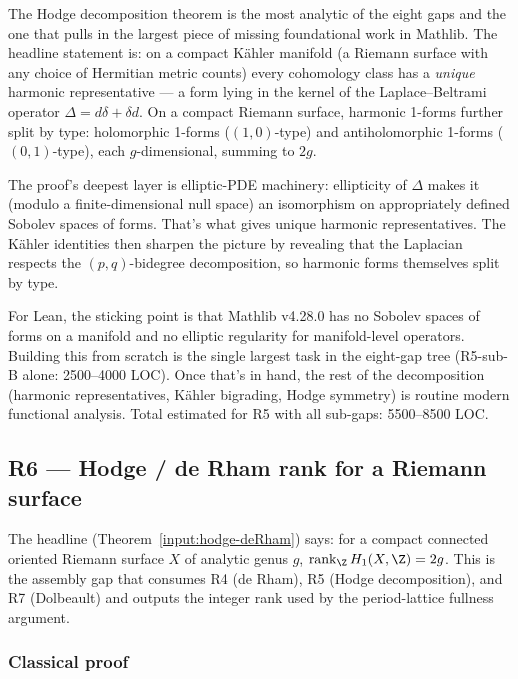 \begin{layman}
The Hodge decomposition theorem is the most analytic of the eight
gaps and the one that pulls in the largest piece of missing
foundational work in Mathlib.  The headline statement is:
on a compact K\"ahler manifold (a Riemann surface with any choice of
Hermitian metric counts) every cohomology class has a \emph{unique}
harmonic representative --- a form lying in the kernel of the
Laplace--Beltrami operator \(\Delta = d\delta + \delta d\).  On a
compact Riemann surface, harmonic 1-forms further split by type:
holomorphic 1-forms (\((1,0)\)-type) and antiholomorphic 1-forms
(\((0,1)\)-type), each \(g\)-dimensional, summing to \(2g\).

The proof's deepest layer is elliptic-PDE machinery: ellipticity of
\(\Delta\) makes it (modulo a finite-dimensional null space) an
isomorphism on appropriately defined Sobolev spaces of forms.
That's what gives unique harmonic representatives.  The K\"ahler
identities then sharpen the picture by revealing that the Laplacian
respects the \((p,q)\)-bidegree decomposition, so harmonic forms
themselves split by type.

For Lean, the sticking point is that Mathlib v4.28.0 has no Sobolev
spaces of forms on a manifold and no elliptic regularity for
manifold-level operators.  Building this from scratch is the
single largest task in the eight-gap tree (R5-sub-B alone:
2500--4000 LOC).  Once that's in hand, the rest of the decomposition
(harmonic representatives, K\"ahler bigrading, Hodge symmetry) is
routine modern functional analysis.  Total estimated for R5 with all
sub-gaps: 5500--8500 LOC.
\end{layman}

\subsection{R6 --- Hodge / de Rham rank for a Riemann surface}
\label{subsec:gap-R6-hodge-deRham}

The headline (Theorem~\ref{input:hodge-deRham}) says: for a compact
connected oriented Riemann surface \(X\) of analytic genus \(g\),
\(\mathrm{rank}_{\Z}\,H_1(X, \Z) = 2g\).  This is the assembly
gap that consumes R4 (de Rham), R5 (Hodge decomposition), and R7
(Dolbeault) and outputs the integer rank used by the
period-lattice fullness argument.

\subsubsection*{Classical proof}

